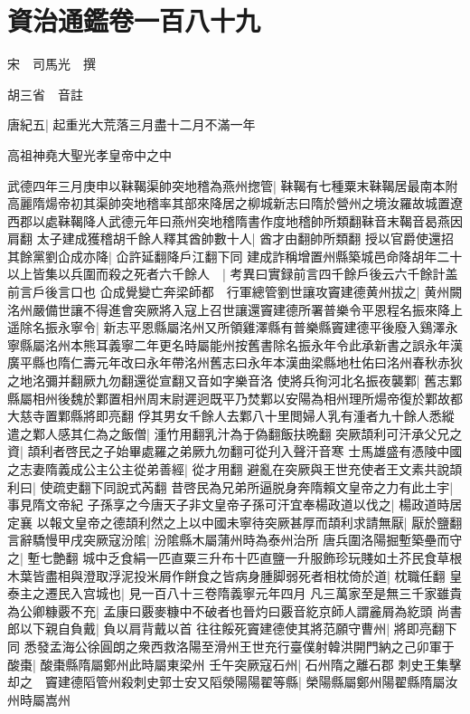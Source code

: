 \chapter{資治通鑑卷一百八十九}


宋　司馬光　撰

胡三省　音註

唐紀五|{
	起重光大荒落三月盡十二月不滿一年}


高祖神堯大聖光孝皇帝中之中

武德四年三月庚申以靺鞨渠帥突地稽為燕州揔管|{
	靺鞨有七種粟末靺鞨居最南本附高麗隋煬帝初其渠帥突地稽率其部來降居之柳城新志曰隋於營州之境汝羅故城置遼西郡以處靺鞨降人武德元年曰燕州突地稽隋書作度地稽帥所類翻靺音末鞨音曷燕因肩翻}
太子建成獲稽胡千餘人釋其酋帥數十人|{
	酋才由翻帥所類翻}
授以官爵使還招其餘黨劉仚成亦降|{
	仚許延翻降戶江翻下同}
建成詐稱增置州縣築城邑命降胡年二十以上皆集以兵圍而殺之死者六千餘人　|{
	考異曰實録前言四千餘戶後云六千餘計盖前言戶後言口也}
仚成覺變亡奔梁師都　行軍總管劉世讓攻竇建德黄州拔之|{
	黄州闕}
洺州嚴備世讓不得進會突厥將入寇上召世讓還竇建德所署普樂令平恩程名振來降上遥除名振永寧令|{
	新志平恩縣屬洺州又所領雞澤縣有普樂縣竇建德平後廢入鷄澤永寧縣屬洺州本熊耳義寧二年更名時屬能州按舊書除名振永年令此承新書之誤永年漢廣平縣也隋仁壽元年改曰永年帶洺州舊志曰永年本漢曲梁縣地杜佑曰洺州春秋赤狄之地洺彌并翻厥九勿翻還從宣翻又音如字樂音洛}
使將兵徇河北名振夜襲鄴|{
	舊志鄴縣屬相州後魏於鄴置相州周末尉遲迥既平乃焚鄴以安陽為相州理所煬帝復於鄴故都大慈寺置鄴縣將即亮翻}
俘其男女千餘人去鄴八十里閲婦人乳有湩者九十餘人悉縱遣之鄴人感其仁為之飯僧|{
	湩竹用翻乳汁為于偽翻飯扶晩翻}
突厥頡利可汗承父兄之資|{
	頡利者啓民之子始畢處羅之弟厥九勿翻可從刋入聲汗音寒}
士馬雄盛有憑陵中國之志妻隋義成公主公主從弟善經|{
	從才用翻}
避亂在突厥與王世充使者王文素共說頡利曰|{
	使疏吏翻下同說式芮翻}
昔啓民為兄弟所逼脱身奔隋賴文皇帝之力有此土宇|{
	事見隋文帝紀}
子孫享之今唐天子非文皇帝子孫可汗宜奉楊政道以伐之|{
	楊政道時居定襄}
以報文皇帝之德頡利然之上以中國未寧待突厥甚厚而頡利求請無厭|{
	厭於鹽翻}
言辭驕慢甲戌突厥寇汾隂|{
	汾隂縣木屬蒲州時為泰州治所}
唐兵圍洛陽掘塹築壘而守之|{
	塹七艶翻}
城中乏食絹一匹直粟三升布十匹直鹽一升服飾珍玩賤如土芥民食草根木葉皆盡相與澄取浮泥投米屑作餅食之皆病身腫脚弱死者相枕倚於道|{
	枕職任翻}
皇泰主之遷民入宫城也|{
	見一百八十三卷隋義寧元年四月}
凡三萬家至是無三千家雖貴為公卿糠覈不充|{
	孟康曰覈麥糠中不破者也晉灼曰覈音紇京師人謂麄屑為紇頭}
尚書郎以下親自負戴|{
	負以肩背戴以首}
往往餒死竇建德使其將范願守曹州|{
	將即亮翻下同}
悉發孟海公徐圓朗之衆西救洛陽至滑州王世充行臺僕射韓洪開門納之己卯軍于酸棗|{
	酸棗縣隋屬鄭州此時屬東梁州}
壬午突厥寇石州|{
	石州隋之離石郡}
刺史王集擊却之　竇建德䧟管州殺刺史郭士安又䧟滎陽陽翟等縣|{
	榮陽縣屬鄭州陽翟縣隋屬汝州時屬嵩州}

